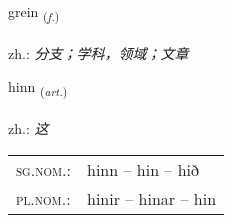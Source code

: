 \documentclass[frontgrid, backgrid]{flacards}\usepackage[]{graphicx}\usepackage[]{xcolor}
\begin{document}
\renewcommand{\flhead}{\vskip5pt \fboxsep=0pt {\small\bfseries\footnotesize Nafnorð | 名词}}
\renewcommand{\fcfoot}{\vskip5pt \fboxsep=0pt \hspace{2pt}{\small\bfseries\footnotesize 1K}}

\renewcommand{\blhead}{\vskip5pt {\small\bfseries\footnotesize Nafnorð | 名词 }}
\renewcommand{\bcfoot}{\vskip5pt \hspace{2pt}{\small\bfseries\footnotesize 1K}}


{grein \small{\textsubscript{(\textit{f.})}} \\[1ex] %
\textphonetic{[kreiːn]} \\
zh.: \emph{分支；学科，领域；文章} \\  [2ex]
\renewcommand*{\arraystretch}{0.8}
}

\renewcommand{\flhead}{\vskip5pt \fboxsep=0pt {\small\bfseries\footnotesize Greinir | 冠词}}
\renewcommand{\fcfoot}{\vskip5pt \fboxsep=0pt \hspace{2pt}{\small\bfseries\footnotesize 1K}}

\renewcommand{\blhead}{\vskip5pt {\small\bfseries\footnotesize Greinir | 冠词 }}
\renewcommand{\bcfoot}{\vskip5pt \hspace{2pt}{\small\bfseries\footnotesize 1K}}


{hinn \small{\textsubscript{(\textit{art.})}} \\[1ex] %
\textphonetic{[hɪn]} \\
zh.: \emph{这} \\  [2ex]
\renewcommand*{\arraystretch}{0.8}
\begin{tabular}{ll}
\textsc{sg.nom.}: & hinn  --  hin -- hið \\ 
\textsc{pl.nom.}: & hinir -- hinar -- hin
\end{tabular}
}
\end{document}
